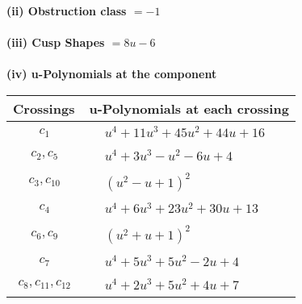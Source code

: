 \documentclass[1p]{elsarticle_modified}
\theoremstyle{definition}
\begin{document}
\flushleft \textbf{(ii) Obstruction class $= -1$}\\~\\
\flushleft \textbf{(iii) Cusp Shapes $= 8 u-6$}\\~\\
\newpage\renewcommand{\arraystretch}{1}
\flushleft \textbf{(iv) u-Polynomials at the component}\newline \\
\begin{tabular}{m{50pt}|m{274pt}}
Crossings & \hspace{64pt}u-Polynomials at each crossing \\
\hline $$\begin{aligned}c_{1}\end{aligned}$$&$\begin{aligned}
&u^4+11 u^3+45 u^2+44 u+16
\end{aligned}$\\
\hline $$\begin{aligned}c_{2},c_{5}\end{aligned}$$&$\begin{aligned}
&u^4+3 u^3- u^2-6 u+4
\end{aligned}$\\
\hline $$\begin{aligned}c_{3},c_{10}\end{aligned}$$&$\begin{aligned}
&(u^2- u+1)^2
\end{aligned}$\\
\hline $$\begin{aligned}c_{4}\end{aligned}$$&$\begin{aligned}
&u^4+6 u^3+23 u^2+30 u+13
\end{aligned}$\\
\hline $$\begin{aligned}c_{6},c_{9}\end{aligned}$$&$\begin{aligned}
&(u^2+u+1)^2
\end{aligned}$\\
\hline $$\begin{aligned}c_{7}\end{aligned}$$&$\begin{aligned}
&u^4+5 u^3+5 u^2-2 u+4
\end{aligned}$\\
\hline $$\begin{aligned}c_{8},c_{11},c_{12}\end{aligned}$$&$\begin{aligned}
&u^4+2 u^3+5 u^2+4 u+7
\end{aligned}$\\
\hline
\end{tabular}\\~\\
\end{document}
